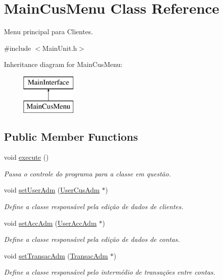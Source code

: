 \hypertarget{classMainCusMenu}{\section{Main\-Cus\-Menu Class Reference}
\label{dc/d35/classMainCusMenu}
}


Menu principal para Clientes.  




{\ttfamily \#include $<$Main\-Unit.\-h$>$}

Inheritance diagram for Main\-Cus\-Menu\-:\begin{figure}[H]
\begin{center}
\leavevmode
\includegraphics[height=2.000000cm]{dc/d35/classMainCusMenu}
\end{center}
\end{figure}
\subsection*{Public Member Functions}
\begin{DoxyCompactItemize}
\item 
void \hyperlink{classMainCusMenu_a91a3ffa75a1deb30dfc6eb604f1a1a2d}{execute} ()
\begin{DoxyCompactList}\small\item\em Passa o controle do programa para a classe em questão. \end{DoxyCompactList}\item 
void \hyperlink{classMainCusMenu_aea07e41b2f2c24496e3ce7a8f55b5332}{set\-User\-Adm} (\hyperlink{classUserCusAdm}{User\-Cus\-Adm} $\ast$)
\begin{DoxyCompactList}\small\item\em Define a classe responsável pela edição de dados de clientes. \end{DoxyCompactList}\item 
void \hyperlink{classMainCusMenu_acaa0828f9ac38816e5a6068f1781f9be}{set\-Acc\-Adm} (\hyperlink{classUserAccAdm}{User\-Acc\-Adm} $\ast$)
\begin{DoxyCompactList}\small\item\em Define a classe responsável pela edição de dados de contas. \end{DoxyCompactList}\item 
void \hyperlink{classMainCusMenu_aa338655efeeb61c43a8089c5577ce47b}{set\-Transac\-Adm} (\hyperlink{classTransacAdm}{Transac\-Adm} $\ast$)
\begin{DoxyCompactList}\small\item\em Define a classe responsável pelo intermédio de transações entre contas. \end{DoxyCompactList}\end{DoxyCompactItemize}


